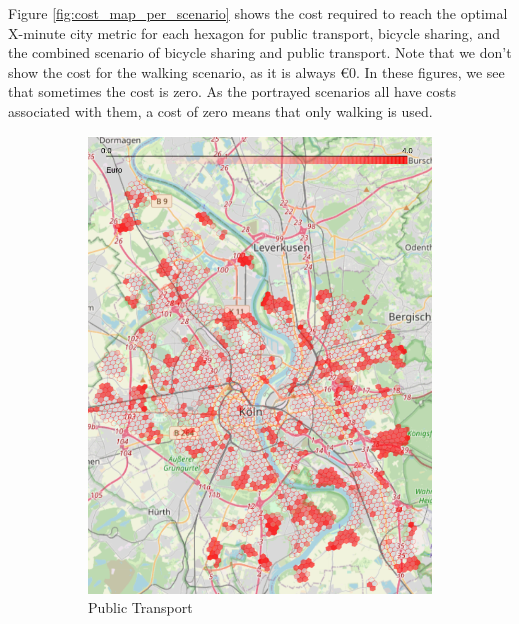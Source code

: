 Figure \ref{fig:cost_map_per_scenario} shows the cost required to reach the optimal X-minute city metric for each hexagon for public transport, bicycle sharing, and the combined scenario of bicycle sharing and public transport.
Note that we don't show the cost for the walking scenario, as it is always \euro{0}.
In these figures, we see that sometimes the cost is zero.
As the portrayed scenarios all have costs associated with them, a cost of zero means that only walking is used.
\begin{figure}
     \centering
     \begin{subfigure}[b]{0.3\textwidth}
         \centering
         \includegraphics[width=\textwidth]{Figures/results/cost/public_transport_cost_map}
         \caption{Public Transport}
         \label{fig:public_transport_cost_map}
     \end{subfigure}
     \hfill
     \begin{subfigure}[b]{0.3\textwidth}
         \centering

\end{subfigure}
\end{figure}

